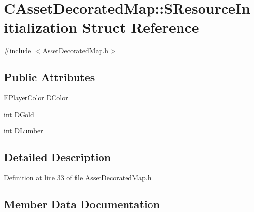 \hypertarget{structCAssetDecoratedMap_1_1SResourceInitialization}{}\section{C\+Asset\+Decorated\+Map\+:\+:S\+Resource\+Initialization Struct Reference}
\label{structCAssetDecoratedMap_1_1SResourceInitialization}


{\ttfamily \#include $<$Asset\+Decorated\+Map.\+h$>$}

\subsection*{Public Attributes}
\begin{DoxyCompactItemize}
\item 
\hyperlink{GameDataTypes_8h_aafb0ca75933357ff28a6d7efbdd7602f}{E\+Player\+Color} \hyperlink{structCAssetDecoratedMap_1_1SResourceInitialization_aadd9840d031d98ba150ff1fccd48e4af}{D\+Color}
\item 
int \hyperlink{structCAssetDecoratedMap_1_1SResourceInitialization_ad47be91c742a06b57bd3a97010625857}{D\+Gold}
\item 
int \hyperlink{structCAssetDecoratedMap_1_1SResourceInitialization_a4592777f741383161a49bce10f2c1932}{D\+Lumber}
\end{DoxyCompactItemize}


\subsection{Detailed Description}


Definition at line 33 of file Asset\+Decorated\+Map.\+h.



\subsection{Member Data Documentation}
\hypertarget{structCAssetDecoratedMap_1_1SResourceInitialization_aadd9840d031d98ba150ff1fccd48e4af}{}\label{structCAssetDecoratedMap_1_1SResourceInitialization_aadd9840d031d98ba150ff1fccd48e4af} 
